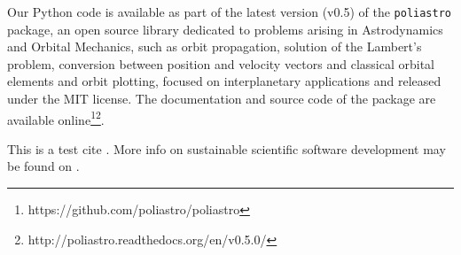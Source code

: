 Our Python code is available as part of the latest version (v0.5) of the \verb|poliastro| package, an open source library dedicated to problems arising in Astrodynamics and Orbital Mechanics, such as orbit propagation, solution of the Lambert's problem, conversion between position and velocity vectors and classical orbital elements and orbit plotting, focused on interplanetary applications and released under the MIT license. The documentation and source code of the package are available online\footnote{https://github.com/poliastro/poliastro}\footnote{http://poliastro.readthedocs.org/en/v0.5.0/}.

This is a test cite \cite{Ziemer2012}. More info on sustainable scientific software development may be found on \cite{brown2015run}.
